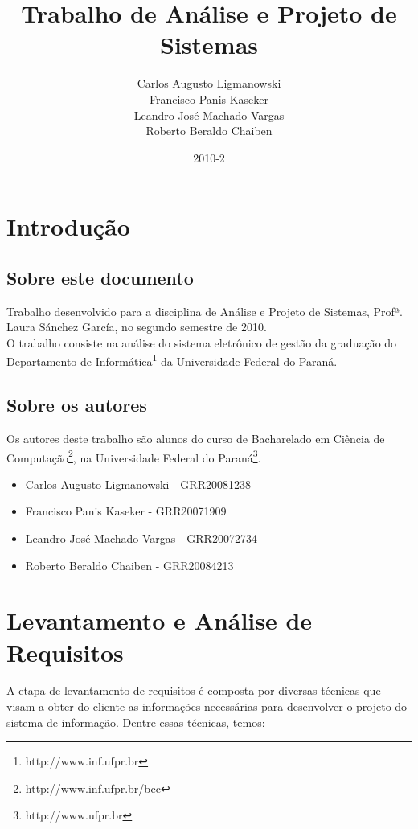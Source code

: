 \documentclass{book}
\title{Trabalho de Análise e Projeto de Sistemas}
\author{Carlos Augusto Ligmanowski \\
		Francisco Panis Kaseker \\
		Leandro José Machado Vargas \\
		Roberto Beraldo Chaiben
}
\date{2010-2}
\begin{document}
\maketitle
\tableofcontents




\chapter{Introdução}

\section{Sobre este documento}

Trabalho desenvolvido para a disciplina de Análise e Projeto de Sistemas, Profª. Laura Sánchez García, no segundo semestre de 2010. \\


O trabalho consiste na análise do sistema eletrônico de gestão da graduação do Departamento de Informática\footnote{http://www.inf.ufpr.br} da Universidade Federal do Paraná.


\section{Sobre os autores}

Os autores deste trabalho são alunos do curso de Bacharelado em Ciência de Computação\footnote{http://www.inf.ufpr.br/bcc}, na Universidade Federal do Paraná\footnote{http://www.ufpr.br}.\\

\begin{itemize}
	\item Carlos Augusto Ligmanowski - GRR20081238
	\item Francisco Panis Kaseker - GRR20071909
	\item Leandro José Machado Vargas - GRR20072734
	\item Roberto Beraldo Chaiben - GRR20084213
\end{itemize}



\chapter{Levantamento e Análise de Requisitos}


A etapa de levantamento de requisitos é composta por diversas técnicas que visam a obter do cliente as
informações necessárias para desenvolver o projeto do sistema de informação. Dentre essas técnicas, temos:\\
\end{document}
